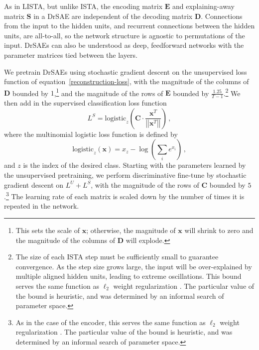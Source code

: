 \documentclass{article} %
\newcommand{\x}{\mathbf{x}}
\newcommand{\C}{\mathbf{C}}
\newcommand{\D}{\mathbf{D}}
\newcommand{\E}{\mathbf{E}}
\newcommand{\Sm}{\mathbf{S}}
\newcommand{\logistic}{\text{logistic}}
\begin{document}
As in LISTA, but unlike ISTA, the encoding matrix $\E$ and explaining-away matrix $\Sm$ in a DrSAE are independent of the decoding matrix $\D$.
Connections from the input to the hidden units, and recurrent connections between the hidden units, are all-to-all, so the network structure is agnostic to permutations of the input.    
DrSAEs can also be understood as deep, feedforward networks with the parameter matrices tied between the layers.


We pretrain DrSAEs using stochastic gradient descent on the unsupervised loss function of equation~\ref{reconstruction-loss}, with the magnitude of the columns of $\D$ bounded by $1$,\footnote{This sets the scale of $\x$; otherwise, the magnitude of $\x$ will shrink to zero and the magnitude of the columns of $\D$ will explode.} and the magnitude of the rows of $\E$ bounded by $\frac{1.25}{T-1}$.\footnote{The size of each ISTA step must be sufficiently small to guarantee convergence.  As the step size grows large, the input will be over-explained by multiple aligned hidden units, leading to extreme oscillations.  This bound serves the same function as $\ell_2$ weight regularization \citep{hinton2010}.  The particular value of the bound is heuristic, and was determined by an informal search of parameter space.}  We then add in the supervised classification loss function
\begin{equation} \label{discriminative-loss}
L^S = \logistic_z \left( \C \cdot \frac{\x^T}{\left|\left| \x^T \right|\right|} \right) \, ,
\end{equation}
where the multinomial logistic loss function is defined by 
\begin{equation*}
  \logistic_z(\x) = x_z - \log\left( \sum_i e^{x_i} \right) \, ,
\end{equation*}
and $z$ is the index of the desired class.
Starting with the parameters learned by the unsupervised pretraining, we perform discriminative fine-tune by stochastic gradient descent on $L^U + L^S$, with the magnitude of the rows of $\C$ bounded by $5$.\footnote{As in the case of the encoder, this serves the same function as $\ell_2$ weight regularization \citep{hinton2010}.  The particular value of the bound is heuristic, and was determined by an informal search of parameter space.}  The learning rate of each matrix is scaled down by the number of times it is repeated in the network.
\end{document}
